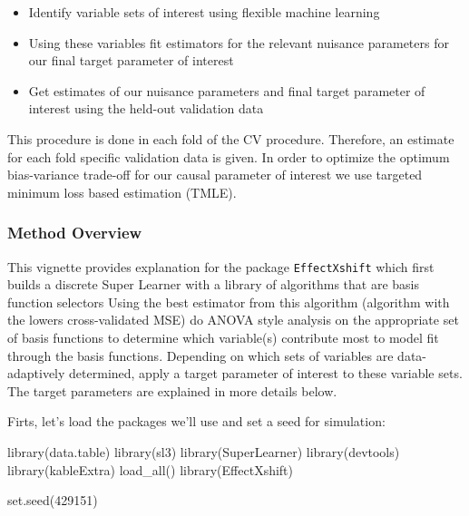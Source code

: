\documentclass[
]{article}
\newenvironment{Shaded}{\begin{snugshade}}{\end{snugshade}}
\newcommand{\DecValTok}[1]{\textcolor[rgb]{0.00,0.00,0.81}{#1}}
\newcommand{\FunctionTok}[1]{\textcolor[rgb]{0.00,0.00,0.00}{#1}}
\newcommand{\NormalTok}[1]{#1}
\providecommand{\tightlist}{%
  \setlength{\itemsep}{0pt}\setlength{\parskip}{0pt}}
\begin{document}
\begin{itemize}
\tightlist
\item
  Identify variable sets of interest using flexible machine learning
\item
  Using these variables fit estimators for the relevant nuisance
  parameters for our final target parameter of interest
\item
  Get estimates of our nuisance parameters and final target parameter of
  interest using the held-out validation data
\end{itemize}

This procedure is done in each fold of the CV procedure. Therefore, an
estimate for each fold specific validation data is given. In order to
optimize the optimum bias-variance trade-off for our causal parameter of
interest we use targeted minimum loss based estimation (TMLE).

\hypertarget{method-overview}{%
\subsubsection{Method Overview}\label{method-overview}}

This vignette provides explanation for the package \texttt{EffectXshift}
which first builds a discrete Super Learner with a library of algorithms
that are basis function selectors Using the best estimator from this
algorithm (algorithm with the lowers cross-validated MSE) do ANOVA style
analysis on the appropriate set of basis functions to determine which
variable(s) contribute most to model fit through the basis functions.
Depending on which sets of variables are data-adaptively determined,
apply a target parameter of interest to these variable sets. The target
parameters are explained in more details below.

Firts, let's load the packages we'll use and set a seed for simulation:

\begin{Shaded}
\begin{Highlighting}[]
\FunctionTok{library}\NormalTok{(data.table)}
\FunctionTok{library}\NormalTok{(sl3)}
\FunctionTok{library}\NormalTok{(SuperLearner)}
\FunctionTok{library}\NormalTok{(devtools)}
\FunctionTok{library}\NormalTok{(kableExtra)}
\FunctionTok{load\_all}\NormalTok{()}
\FunctionTok{library}\NormalTok{(EffectXshift)}

\FunctionTok{set.seed}\NormalTok{(}\DecValTok{429151}\NormalTok{)}
\end{Highlighting}
\end{Shaded}
\end{document}
